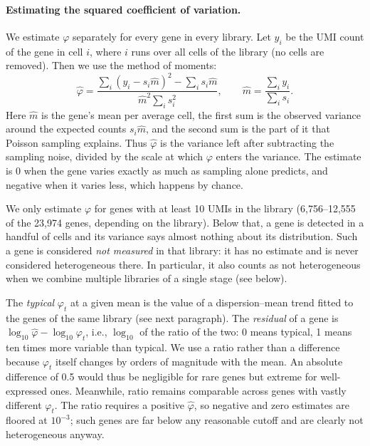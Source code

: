 \documentclass[11pt,a4paper]{article}
\begin{document}
\paragraph{Estimating the squared coefficient of variation.} We estimate $\varphi$ separately for every gene in every library. Let $y_i$ be the UMI count of the gene in cell $i$, where $i$ runs over all cells of the library (no cells are removed). Then we use the method of moments:
\[
	\hat\varphi = \frac{\sum_i (y_i - s_i \hat m)^2 - \sum_i s_i \hat m}{\hat m^2 \sum_i s_i^2},\qquad \hat m = \frac{\sum_i y_i}{\sum_i s_i}.
\]
Here $\hat m$ is the gene's mean per average cell, the first sum is the observed variance around the expected counts $s_i \hat m$, and the second sum is the part of it that Poisson sampling explains. Thus $\hat\varphi$ is the variance left after subtracting the sampling noise, divided by the scale at which $\varphi$ enters the variance. The estimate is $0$ when the gene varies exactly as much as sampling alone predicts, and negative when it varies less, which happens by chance.

We only estimate $\varphi$ for genes with at least 10 UMIs in the library (6{,}756--12{,}555 of the 23{,}974 genes, depending on the library). Below that, a gene is detected in a handful of cells and its variance says almost nothing about its distribution. Such a gene is considered \emph{not measured} in that library: it has no estimate and is never considered heterogeneous there. In particular, it also counts as not heterogeneous when we combine multiple libraries of a single stage (see below).

The \emph{typical} $\varphi_t$ at a given mean is the value of a dispersion--mean trend fitted to the genes of the same library (see next paragraph). The \emph{residual} of a gene is $\log_{10} \hat\varphi - \log_{10} \varphi_t$, i.e., $\log_{10}$ of the ratio of the two: 0 means typical, 1 means ten times more variable than typical. We use a ratio rather than a difference because $\varphi_t$ itself changes by orders of magnitude with the mean. An absolute difference of 0.5 would thus be negligible for rare genes but extreme for well-expressed ones. Meanwhile, ratio remains comparable across genes with vastly different $\varphi_t$. The ratio requires a positive $\hat\varphi$, so negative and zero estimates are floored at $10^{-3}$; such genes are far below any reasonable cutoff and are clearly not heterogeneous anyway. 
\end{document}
